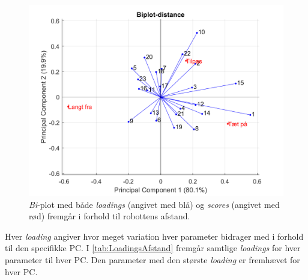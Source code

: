 \begin{figure}[H]
\centering
\includegraphics[width=\textwidth]{Figure/DatabehandlingSkalaer/PCAfigures/Distance-Biplot.png}
\caption{\textit{Bi}-plot med både \textit{loadings} (angivet med blå) og \textit{scores} (angivet med rød) fremgår i forhold til robottens afstand.}
\label{fig:Distance-Biplot}
\end{figure}
\noindent
%
Hver \textit{loading} angiver hvor meget variation hver parameter bidrager med i forhold til den specifikke PC. I \autoref{tab:LoadingsAfstand} fremgår samtlige \textit{loadings} for hver parameter til hver PC. Den parameter med den største \textit{loading} er fremhævet for hver PC. 
%
